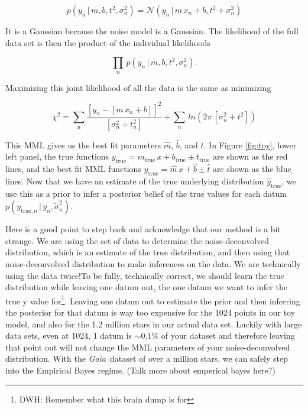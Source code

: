 \documentclass[modern]{aastex61}
\newcommand{\project}[1]{\textsl{#1}}
\newcommand{\gaia}{\project{Gaia}}
\newcommand{\given}{\,|\,}
\newcommand{\true}{\mathrm{true}}
\begin{document}
\begin{equation}
p(y_n \given m, b, t^2, \sigma_n^2) = \mathcal{N}(y_n \given m\,x_n + b, t^2 + \sigma_n^2)
\label{eq:toyLike}
\end{equation}

It is a Gaussian because the noise model is a Gaussian. The likelihood of the full data set is then the product of the individual likelihoods

\begin{equation}
\prod_n\, p(y_n \given m, b, t^2, \sigma_n^2).
\label{eq:toyLikeFull}
\end{equation}

Maximizing this joint likelihood of all the data is the same as minimizing

\begin{equation}
\chi^2 = \sum_n \frac{[y_n - [m\,x_n + b]]^2}{[\sigma_n^2 + t_n^2]} + \sum_n\,ln(2\pi\,[\sigma_n^2 + t^2])
\label{eq:chisq}
\end{equation}

This MML gives us the best fit parameters $\hat{m}$, $\hat{b}$, and $\hat{t}$. In Figure \ref{fig:toy}, lower left panel, the true functions $y_{\true} = m_{\true}\,x + b_{\true} \pm t_{\true}$ are shown as the red lines, and the best fit MML functions $\hat{y}_{\true} = \hat{m}\, x + \hat{b} \pm \hat{t}$ are shown as the blue lines. Now that we have an estimate of the true underlying distribution $\hat{y}_{\true}$, we use this as a prior to infer a posterior belief of the true values for each datum $p(y_{\true,n} \given y_n, \tilde{\sigma}_n^2)$.

Here is a good point to step back and acknowledge that our method is a bit strange. We are using the set of data to determine the noise-deconvolved distribution, which is an estimate of the true distribution, and then using that noise-deconvolved distribution to make inferences on the data. We are technically using the data twice!To be fully, technically correct, we should learn the true distribution while leaving one datum out, the one datum we want to infer the true y value for\footnote{DWH: Remember what this brain dump is for}. Leaving one datum out to estimate the prior and then inferring the posterior for that datum is way too expensive for the 1024 points in our toy model, and also for the 1.2 million stars in our actual data set. Luckily with large data sets, even at 1024, 1 datum is $\sim0.1\%$ of your dataset and therefore leaving that point out will not change the MML parameters of your noise-deconvolved distribution. With the \gaia\ dataset of over a million stars, we can safely step into the Empirical Bayes regime. (Talk more about emperical bayes here?)
\end{document}
